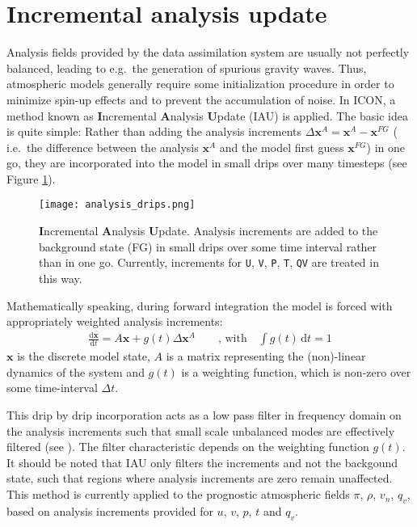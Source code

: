 \section{Incremental analysis update}
Analysis fields provided by the data assimilation system are usually not perfectly balanced, leading to e.g.\ the generation of spurious gravity waves. 
Thus, atmospheric models generally require some initialization procedure in order to minimize spin-up effects and to prevent the accumulation of noise. In ICON, 
a method known as \textbf{I}ncremental \textbf{A}nalysis \textbf{U}pdate (IAU) \citep{Bloom96, Polavarapu04} is applied. The basic idea is quite simple: 
Rather than adding the analysis increments $\Delta \mathbf{x}^{A}=\mathbf{x}^{A} - \mathbf{x}^{FG}$ ( i.e.\ the difference between the analysis 
$\mathbf{x}^{A}$ and the model first guess $\mathbf{x}^{FG}$) in one go, they are incorporated into the model in small drips over many timesteps 
(see Figure \ref{fig_ana_drips}).
\begin{figure}[hbt]
 \centering
 \texttt{[image: analysis\_drips.png]}
 \caption{\textbf{I}ncremental \textbf{A}nalysis \textbf{U}pdate. Analysis increments are added to the background state (FG) in small drips over 
some time interval rather than in one go. Currently, increments for \texttt{U}, \texttt{V}, \texttt{P}, \texttt{T}, \texttt{QV} are treated in 
this way.}\label{fig_ana_drips}
\end{figure}

Mathematically speaking, during forward integration the model is forced with appropriately weighted analysis increments:
\begin{align}
 \frac{\mathrm{d} \mathbf{x}}{\mathrm{d} t} = A\mathbf{x} + g(t)\Delta\mathbf{x}^{A}\qquad \text{, with}\quad \int g(t)\, \mathrm{d}t = 1
\end{align}
$\mathbf{x}$ is the discrete model state, $A$ is a matrix representing the (non)-linear dynamics of the system and $g(t)$ is a weighting 
function, which is non-zero over some time-interval $\Delta t$.

This drip by drip incorporation acts as a low pass filter in frequency domain on the analysis increments such that 
small scale unbalanced modes are effectively filtered (see \cite{Bloom96}). The filter characteristic depends on the weighting function 
$g(t)$. It should be noted that IAU only filters the increments and not the backgound state, such that regions where analysis increments are 
zero remain unaffected. This method is currently applied to the prognostic atmospheric fields $\pi$, $\rho$, $v_{n}$, $q_{v}$, based on 
analysis increments provided for $u$, $v$, $p$, $t$ and $q_{v}$.

